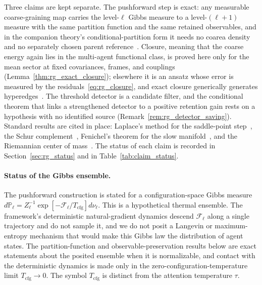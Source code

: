 \documentclass[11pt]{article}
\begin{document}
Three claims are kept separate. The pushforward step is exact: any measurable coarse-graining map carries the level-$\ell$ Gibbs measure to a level-$(\ell+1)$ measure with the same partition function and the same retained observables, and in the companion theory's conditional-partition form it needs no coarea density and no separately chosen parent reference~\cite[Ch.~11]{DennisGaugeVFE2026}. Closure, meaning that the coarse energy again lies in the multi-agent functional class, is proved here only for the mean sector at fixed covariances, frames, and couplings (Lemma~\ref{thm:rg_exact_closure}); elsewhere it is an ansatz whose error is measured by the residuals~\eqref{eq:rg_closure}, and exact closure generically generates hyperedges~\cite[Ch.~11]{DennisGaugeVFE2026}. The threshold detector is a candidate filter, and the conditional theorem that links a strengthened detector to a positive retention gain rests on a hypothesis with no identified source (Remark~\ref{rem:rg_detector_saving}). Standard results are cited in place: Laplace's method for the saddle-point step~\cite{wong2001asymptotic}, the Schur complement~\cite{HornJohnson2013}, Fenichel's theorem for the slow manifold~\cite{fenichel1979geometric}, and the Riemannian center of mass~\cite{Karcher1977, Afsari2011}. The status of each claim is recorded in Section~\ref{sec:rg_status} and in Table~\ref{tab:claim_status}.

\paragraph{Status of the Gibbs ensemble.}
The pushforward construction is stated for a configuration-space Gibbs measure $d\mathbb{P}_\ell = Z_\ell^{-1}\exp[-\mathcal{F}_\ell/T_{\mathrm{cfg}}]d\nu_\ell$. This is a hypothetical thermal ensemble. The framework's deterministic natural-gradient dynamics descend $\mathcal{F}_\ell$ along a single trajectory and do not sample it, and we do not posit a Langevin or maximum-entropy mechanism that would make this Gibbs law the distribution of agent states. The partition-function and observable-preservation results below are exact statements about the posited ensemble when it is normalizable, and contact with the deterministic dynamics is made only in the zero-configuration-temperature limit $T_{\mathrm{cfg}}\to0$. The symbol $T_{\mathrm{cfg}}$ is distinct from the attention temperature $\tau$.
\end{document}
